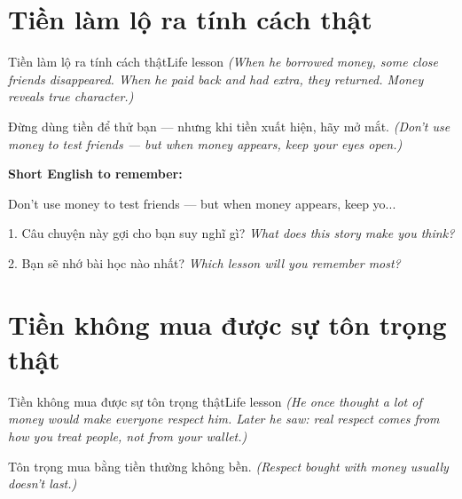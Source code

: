 \section{Tiền làm lộ ra tính cách thật}
\begin{truyen}{Tiền làm lộ ra tính cách thật}{Life lesson}
\textit{(When he borrowed money, some close friends disappeared. When he paid back and had extra, they returned. Money reveals true character.)}
\end{truyen}

\begin{baihoc}
Đừng dùng tiền để thử bạn — nhưng khi tiền xuất hiện, hãy mở mắt.
\textit{(Don't use money to test friends — but when money appears, keep your eyes open.)}
\end{baihoc}

\begin{ghinhoanh}
\textbf{Short English to remember:}

Don't use money to test friends — but when money appears, keep yo...

\end{ghinhoanh}

\begin{tuhocnhanh}
1. Câu chuyện này gợi cho bạn suy nghĩ gì? \textit{What does this story make you think?}

2. Bạn sẽ nhớ bài học nào nhất? \textit{Which lesson will you remember most?}
\end{tuhocnhanh}
\ngancach


\section{Tiền không mua được sự tôn trọng thật}
\begin{truyen}{Tiền không mua được sự tôn trọng thật}{Life lesson}
\textit{(He once thought a lot of money would make everyone respect him. Later he saw: real respect comes from how you treat people, not from your wallet.)}
\end{truyen}

\begin{baihoc}
Tôn trọng mua bằng tiền thường không bền.
\textit{(Respect bought with money usually doesn't last.)}
\end{baihoc}

